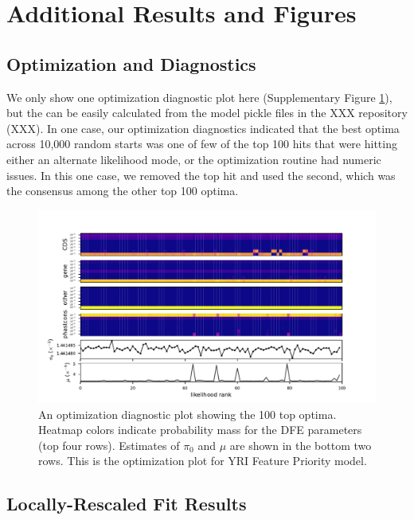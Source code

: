 \documentclass[11pt]{article}
\begin{document}
\section{Additional Results and Figures}

\subsection{Optimization and Diagnostics}
\label{supp:optim}

We only show one optimization diagnostic plot here (Supplementary Figure
\ref{suppfig:diag-plot}), but the can be easily calculated from the model
pickle files in the XXX repository (XXX). In one case, our optimization
diagnostics indicated that the best optima across 10,000 random starts was one
of few of the top 100 hits that were hitting either an alternate likelihood
mode, or the optimization routine had numeric issues. In this one case, we
removed the top hit and used the second, which was the consensus among the
other top 100 optima. 

\begin{figure}[htbp]
  \label{suppfig:diag-plot}
  \centering
  \includegraphics[width=\textwidth]{figures/supplementary/figure_feature_priority_yri_full_diag.pdf}

  \caption{ An optimization diagnostic plot showing the 100 top optima. Heatmap
  colors indicate probability mass for the DFE parameters (top four rows).
  Estimates of $\pi_0$ and $\mu$ are shown in the bottom two rows. This is the
optimization plot for YRI Feature Priority model.}
\end{figure}

\subsection{Locally-Rescaled Fit Results}
\end{document}
